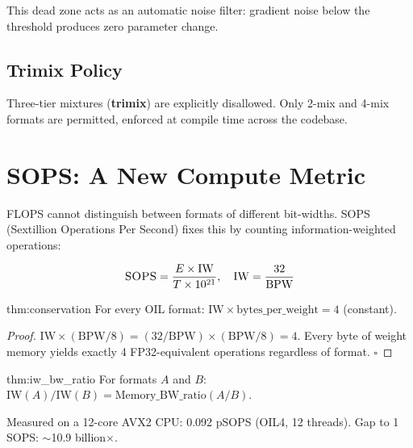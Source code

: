 \documentclass[11pt,a4paper]{article}
\theoremstyle{definition}
\newcommand{\SOPS}{\textsc{SOPS}}
\newcommand{\IW}{\mathrm{IW}}
\newcommand{\BPW}{\mathrm{BPW}}
\begin{document}
This dead zone acts as an automatic noise filter: gradient noise below the threshold produces zero parameter change.

\subsection{Trimix Policy}

Three-tier mixtures (\textbf{trimix}) are explicitly disallowed. Only 2-mix and 4-mix formats are permitted, enforced at compile time across the codebase.


\section{SOPS: A New Compute Metric}
\label{sec:sops}

FLOPS cannot distinguish between formats of different bit-widths. SOPS (Sextillion Operations Per Second) fixes this by counting information-weighted operations:

\begin{equation}
\SOPS = \frac{E \times \IW}{T \times 10^{21}}, \quad \IW = \frac{32}{\BPW}
\label{eq:sops}
\end{equation}

\begin{mythm}{thm:conservation}
For every OIL format: $\IW \times \text{bytes\_per\_weight} = 4$ (constant).
\end{mythm}

\begin{proof}
$\IW \times (\BPW / 8) = (32 / \BPW) \times (\BPW / 8) = 4$. Every byte of weight memory yields exactly 4 FP32-equivalent operations regardless of format. $\square$
\end{proof}

\begin{mythm}[Info Weight = Memory Bandwidth Ratio]{thm:iw_bw_ratio}
For formats $A$ and $B$: $\IW(A) / \IW(B) = \text{Memory\_BW\_ratio}(A/B)$.
\end{mythm}

Measured on a 12-core AVX2 CPU: 0.092 pSOPS (OIL4, 12 threads). Gap to 1 SOPS: $\sim$10.9 billion$\times$.

\end{document}
